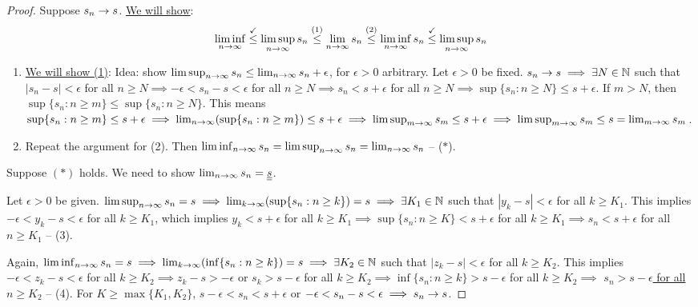 \documentclass[]{article}
\begin{document}
\begin{proof}
	\say{$\implies$} Suppose $s_n\rightarrow s$. \ul{We will show}: 
	$$ \liminf_{n\rightarrow\infty} \overset{\checkmark}{\leq} \limsup_{n\rightarrow\infty} s_n \overset{(1)}{\leq} \lim_{n\rightarrow\infty} s_n \overset{(2)}{\leq} \liminf_{n\rightarrow\infty} s_n \overset{\checkmark}{\leq} \limsup_{n\rightarrow\infty} s_n$$
	\begin{enumerate}
		\item \ul{We will show (1)}: Idea: show $\limsup_{n\rightarrow\infty} s_n \leq \lim_{n\rightarrow\infty} s_n + \epsilon$, for $\epsilon > 0$ arbitrary.
			Let $\epsilon > 0$ be fixed. $s_n\rightarrow s\implies \exists N\in\mathbb{N}$ such that $|s_n-s|<\epsilon$ for all $n\geq N \implies -\epsilon < s_n-s < \epsilon$ for all $n\geq N \implies s_n < s+\epsilon$ for all $n\geq N \implies \sup\{s_n:n\geq N\}\leq s+\epsilon$.
			If $m>N$, then $\sup\{s_n:n\geq m\} \leq \sup\{s_n:n\geq N\}$.
			This means $\sup\{s_n:n\geq m\}\leq s+\epsilon \implies \lim_{n\rightarrow\infty}(\sup\{s_n:n\geq m\})\leq s+\epsilon \implies \limsup_{m\rightarrow\infty} s_m \leq s+\epsilon \implies \limsup_{m\rightarrow\infty} s_m \leq s = \lim_{m\rightarrow\infty} s_m$.
		\item Repeat the argument for (2).
			Then $\liminf_{n\rightarrow\infty} s_n = \limsup_{n\rightarrow\infty} s_n = \lim_{n\rightarrow\infty} s_n$ -- ($*$).
	\end{enumerate}
	\say{$\Lra$} Suppose $(*)$ holds. We need to show $\lim_{n\rightarrow\infty} s_n = \underline{\underline{s}}$.
	
	Let $\epsilon>0$ be given. $\limsup_{n\rightarrow\infty}s_n = s \implies \lim_{k\rightarrow\infty}(\sup\{s_n:n\geq k\}) = s \implies \exists K_1\in\mathbb{N} $ such that $|y_k-s|<\epsilon$ for all $k\geq K_1$.
	This implies $-\epsilon < y_k-s<\epsilon$ for all $k\geq K_1$, which implies $y_k < s+\epsilon$ for all $k\geq K_1 \implies \sup\{s_n:n\geq K\} < s+\epsilon$ for all $k\geq K_1 \implies s_n<s+\epsilon$ for all $n\geq K_1$ -- (3).

	Again, $\liminf_{n\rightarrow\infty} s_n = s \implies \lim_{k\rightarrow\infty}(\inf\{s_n:n\geq k\}) = s \implies \exists K_2\in\mathbb{N}$ such that $|z_k -s|<\epsilon$ for all $k\geq K_2$.
	This implies $-\epsilon < z_k - s< \epsilon$ for all $k\geq K_2 \implies z_k-s>-\epsilon$ or $s_k > s-\epsilon$ for all $k\geq K_2 \implies \inf\{s_n:n\geq k\} > s-\epsilon$ for all $k\geq K_2 \implies$ \ul{$s_n>s-\epsilon$ for all $n\geq K_2$} -- (4).
	For $K\geq \max\{K_1,K_2\}$, $s-\epsilon <s_n < s+\epsilon$ or $-\epsilon < s_n-s < \epsilon \implies s_n\rightarrow s$.
\end{proof}
\end{document}
